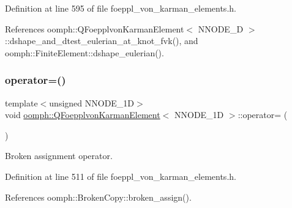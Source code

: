 Definition at line 595 of file foeppl\+\_\+von\+\_\+karman\+\_\+elements.\+h.



References oomph\+::\+Q\+Foepplvon\+Karman\+Element$<$ N\+N\+O\+D\+E\+\_\+D $>$\+::dshape\+\_\+and\+\_\+dtest\+\_\+eulerian\+\_\+at\+\_\+knot\+\_\+fvk(), and oomph\+::\+Finite\+Element\+::dshape\+\_\+eulerian().

\mbox{\label{classoomph_1_1QFoepplvonKarmanElement_a43024063c1688999c250f2becf0a1ab6}} 
\subsubsection{\texorpdfstring{operator=()}{operator=()}}
{\footnotesize\ttfamily template$<$unsigned N\+N\+O\+D\+E\+\_\+1D$>$ \\
void \hyperlink{classoomph_1_1QFoepplvonKarmanElement}{oomph\+::\+Q\+Foepplvon\+Karman\+Element}$<$ N\+N\+O\+D\+E\+\_\+1D $>$\+::operator= (\begin{DoxyParamCaption}\item[{const \hyperlink{classoomph_1_1QFoepplvonKarmanElement}{Q\+Foepplvon\+Karman\+Element}$<$ N\+N\+O\+D\+E\+\_\+1D $>$ \&}]{ }\end{DoxyParamCaption})\hspace{0.3cm}{\ttfamily [inline]}}



Broken assignment operator. 



Definition at line 511 of file foeppl\+\_\+von\+\_\+karman\+\_\+elements.\+h.



References oomph\+::\+Broken\+Copy\+::broken\+\_\+assign().

\mbox{\label{classoomph_1_1QFoepplvonKarmanElement_a283a3078077c6feefb9894e17e9f7b7a}} 
